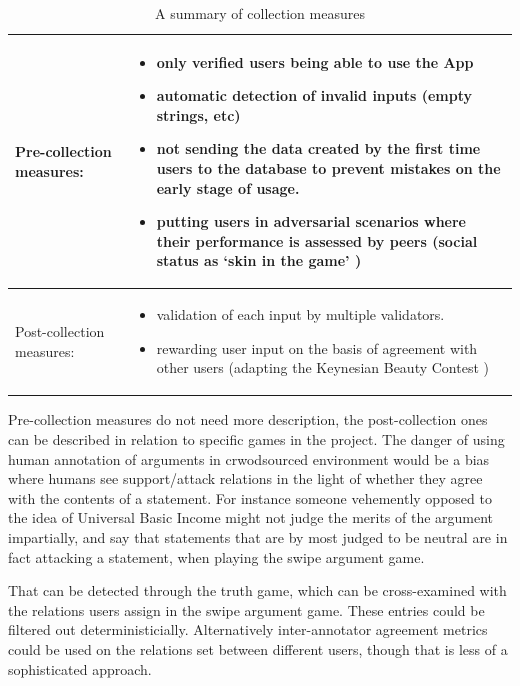 \documentclass{report}
\begin{document}
  \begin{table}[h!]
      \centering
      \begin{center}
        
    \begin{tabular}{|l|p{8cm}|}

\toprule
Pre-collection measures:  & \begin{itemize}[left=0pt,topsep=0pt]\item only verified users being able to use the App
  \item automatic detection of invalid inputs (empty strings, etc)
  \item not sending the data created by the first time users to the database to prevent mistakes on the early stage of usage.
  \item putting users in adversarial scenarios where their performance is assessed by peers (social status as `skin in the game' \cite{noauthor_have_2023})
\end{itemize} \\
\midrule

 Post-collection measures:  & \begin{itemize}[left=0pt,topsep=0pt]
  \item validation of each input by multiple validators.  
  \item rewarding user input on the basis of agreement with other users (adapting the Keynesian Beauty Contest \cite{keynes_general_1935})

\end{itemize} \\
\bottomrule
    \end{tabular}
      \end{center}
    \caption{A summary of collection measures}

 \end{table}
Pre-collection measures do not need more description, the post-collection ones can be described in relation to specific games in the project.
The danger of using human annotation of arguments in crwodsourced environment would be a bias where humans see support/attack relations in the light of whether they agree with the contents of a statement. For instance someone vehemently opposed to the idea of Universal Basic Income might not judge the merits of the argument impartially, and say that statements that are by most judged to be neutral are in fact attacking a statement, when playing the swipe argument game.

That can be detected through the truth game, which can be cross-examined with the relations users assign in the swipe argument game. These entries could be filtered out deterministicially. Alternatively inter-annotator agreement metrics could be used on the relations set between different users, though that is less of a sophisticated approach.
\end{document}
